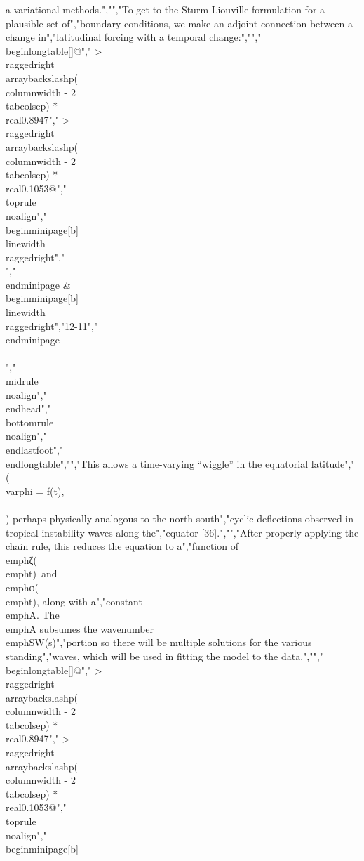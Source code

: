 {{{{{{{{{{a variational methods.","","To get to the Sturm-Liouville formulation for a plausible set of","boundary conditions, we make an adjoint connection between a change in","latitudinal forcing with a temporal change:","","\\begin{longtable}[]{@{}","  >{\\raggedright\\arraybackslash}p{(\\columnwidth - 2\\tabcolsep) * \\real{0.8947}}","  >{\\raggedright\\arraybackslash}p{(\\columnwidth - 2\\tabcolsep) * \\real{0.1053}}@{}}","\\toprule\\noalign{}","\\begin{minipage}[b]{\\linewidth}\\raggedright","\\[\\begin{array}{r}","\\frac{\\partial\\zeta}{\\partial\\varphi} = \\frac{\\partial\\zeta}{\\partial t}\\frac{\\partial t}{\\partial\\varphi}","\\end{array}\\]","\\end{minipage} & \\begin{minipage}[b]{\\linewidth}\\raggedright","12-11","\\end{minipage} \\\\","\\midrule\\noalign{}","\\endhead","\\bottomrule\\noalign{}","\\endlastfoot","\\end{longtable}","","This allows a time-varying ``wiggle'' in the equatorial latitude","\\(\\varphi = f(t),\\ \\) perhaps physically analogous to the north-south","cyclic deflections observed in tropical instability waves along the","equator {[}36{]}.","","After properly applying the chain rule, this reduces the equation to a","function of \\emph{ζ}(\\emph{t})~and \\emph{φ}(\\emph{t}), along with a","constant \\emph{A}. The \\emph{A} subsumes the wavenumber \\emph{SW(s)}","portion so there will be multiple solutions for the various standing","waves, which will be used in fitting the model to the data.","","\\begin{longtable}[]{@{}","  >{\\raggedright\\arraybackslash}p{(\\columnwidth - 2\\tabcolsep) * \\real{0.8947}}","  >{\\raggedright\\arraybackslash}p{(\\columnwidth - 2\\tabcolsep) * \\real{0.1053}}@{}}","\\toprule\\noalign{}","\\begin{minipage}[b]}}}}}}}}}}
